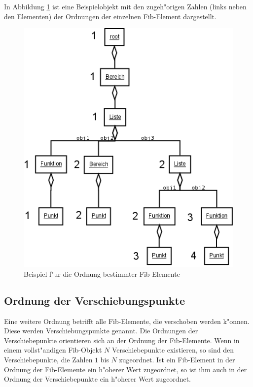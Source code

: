 In Abbildung \ref{figOrderSpecialFibElements} ist eine Beispielobjekt mit den zugeh"origen Zahlen (links neben den Elementen) der Ordnungen der einzelnen Fib-Element dargestellt.

\begin{figure}[htbp]
\begin{center}
  \includegraphics[scale=0.5]{order_special_elements}
\end{center}
\caption{Beispiel f"ur die Ordnung bestimmter Fib-Elemente}
\label{figOrderSpecialFibElements}
\end{figure}


\subsection{Ordnung der Verschiebungspunkte}

Eine weitere Ordnung betrifft alle Fib-Elemente, die verschoben werden k"onnen. Diese werden Verschiebungspunkte genannt.
Die Ordnungen der Verschiebepunkte orientieren sich an der Ordnung der Fib-Elemente. Wenn in einem vollst"andigen Fib-Objekt $N$ Verschiebepunkte existieren, so sind den Verschiebepunkte, die Zahlen $1$ bis $N$ zugeordnet. Ist ein Fib-Element in der Ordnung der Fib-Elemente ein h"oherer Wert zugeordnet, so ist ihm auch in der Ordnung der Verschiebepunkte ein h"oherer Wert zugeordnet.

